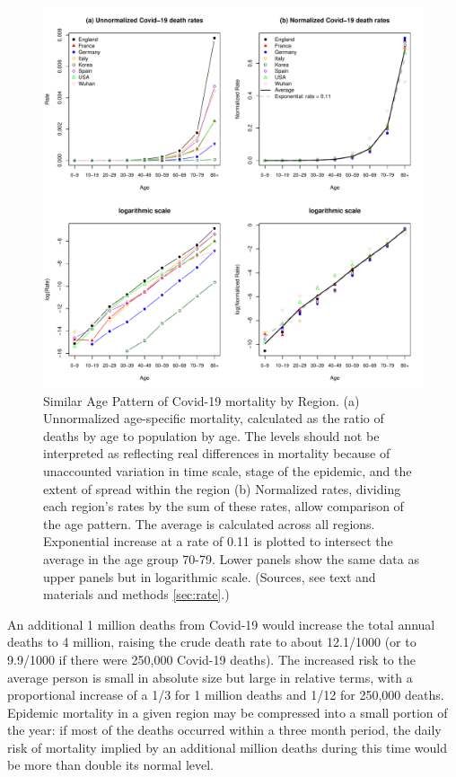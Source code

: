 \documentclass[9pt,twocolumn,twoside,lineno]{pnas-new}
\begin{document}
\begin{figure}[h]%
\centering
\includegraphics[width=.8\linewidth]{./fig1_age_specific_covid_rates}
\caption{Similar Age Pattern of Covid-19 mortality by Region. (a)
  Unnormalized age-specific mortality, calculated as the ratio of
  deaths by age to population by age. The levels should not be
  interpreted as reflecting real differences in mortality because of
  unaccounted variation in time scale, stage of the epidemic, and the
  extent of spread within the region (b) Normalized rates, dividing
  each region's rates by the sum of these rates, allow comparison of
  the age pattern. The average is calculated across all
  regions. Exponential increase at a rate of 0.11 is plotted to
  intersect the average in the age group 70-79. Lower panels show the
  same data as upper panels but in logarithmic scale. (Sources, see
  text and materials and methods \ref{sec:rate}.)}
\label{fig:asmr}
\end{figure}

An additional 1 million deaths from Covid-19 would increase the total
annual deaths to 4 million, raising the crude death rate to about
12.1/1000 (or to 9.9/1000 if there were 250,000 Covid-19 deaths). The
increased risk to the average person is small in absolute size but
large in relative terms, with a proportional increase of a 1/3 for 1
million deaths and 1/12 for 250,000 deaths.  Epidemic mortality in a
given region may be compressed into a small portion of the year: if
most of the deaths occurred within a three month period, the daily
risk of mortality implied by an additional million deaths during this
time would be more than double its normal level.
\end{document}
